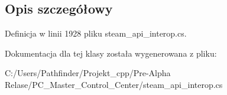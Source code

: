 \subsection{Opis szczegółowy}


Definicja w linii 1928 pliku steam\+\_\+api\+\_\+interop.\+cs.



Dokumentacja dla tej klasy została wygenerowana z pliku\+:\begin{DoxyCompactItemize}
\item 
C\+:/\+Users/\+Pathfinder/\+Projekt\+\_\+cpp/\+Pre-\/\+Alpha Relase/\+P\+C\+\_\+\+Master\+\_\+\+Control\+\_\+\+Center/steam\+\_\+api\+\_\+interop.\+cs\end{DoxyCompactItemize}
